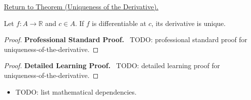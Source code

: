 \newpage
{}
\label{prf:uniqueness-of-the-derivative}

\begin{remark*}[Return]
\hyperref[thm:uniqueness-of-the-derivative]{Return to Theorem (Uniqueness of the Derivative).}
\end{remark*}

\begin{theorem*}
Let $f : A \to \mathbb{R}$ and $c \in A$. If $f$ is differentiable at $c$, its derivative is unique.

\smallskip\noindent
\end{theorem*}

\begin{proof}
\textbf{Professional Standard Proof.}~
TODO: professional standard proof for uniqueness-of-the-derivative.
\end{proof}

\begin{proof}
\textbf{Detailed Learning Proof.}~
TODO: detailed learning proof for uniqueness-of-the-derivative.
\end{proof}

\begin{remark*}
\end{remark*}

\begin{dependencies}
\begin{itemize}
  \item TODO: list mathematical dependencies.
\end{itemize}
\end{dependencies}

\clearpage
